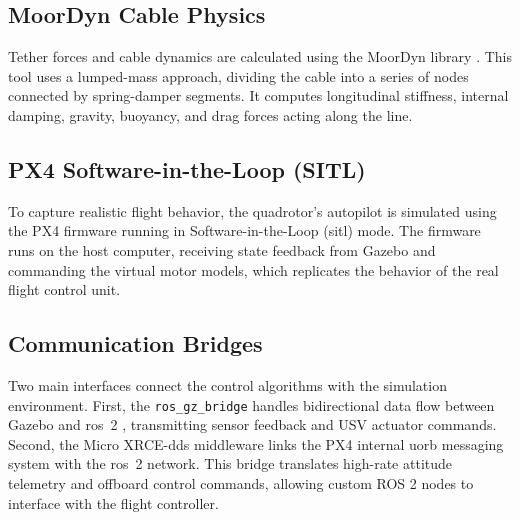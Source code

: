     \subsection{MoorDyn Cable Physics}
    Tether forces and cable dynamics are calculated using the MoorDyn library \cite{hall2015moordyn}. This tool uses a lumped-mass approach, dividing the cable into a series of nodes connected by spring-damper segments. It computes longitudinal stiffness, internal damping, gravity, buoyancy, and drag forces acting along the line.

    \subsection{PX4 Software-in-the-Loop (SITL)}
    To capture realistic flight behavior, the quadrotor's autopilot is simulated using the PX4 firmware \cite{meier2015px4} running in Software-in-the-Loop (\gls{sitl}) mode. The firmware runs on the host computer, receiving state feedback from Gazebo and commanding the virtual motor models, which replicates the behavior of the real flight control unit.

    \subsection{Communication Bridges}
    Two main interfaces connect the control algorithms with the simulation environment. First, the \texttt{ros\_gz\_bridge} handles bidirectional data flow between Gazebo and \gls{ros}~2 \cite{macenski2022ros2}, transmitting sensor feedback and USV actuator commands. Second, the Micro XRCE-\gls{dds} middleware links the PX4 internal \gls{uorb} messaging system with the \gls{ros}~2 network. This bridge translates high-rate attitude telemetry and offboard control commands, allowing custom ROS 2 nodes to interface with the flight controller.

